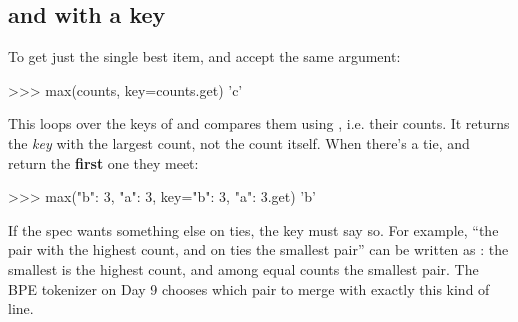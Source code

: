 \documentclass[10pt,a4paper]{article}
\begin{document}
\subsection{ and  with a key}
To get just the single best item,  and  accept the same  argument:
\begin{txtcode}
>>> max(counts, key=counts.get)
'c'
\end{txtcode}
This loops over the keys of  and compares them using , i.e. their counts. It returns the \emph{key} with the largest count, not the count itself.
When there’s a tie,  and  return the \textbf{first} one they meet:
\begin{txtcode}
>>> max({"b": 3, "a": 3}, key={"b": 3, "a": 3}.get)
'b'
\end{txtcode}
If the spec wants something else on ties, the key must say so. For example, “the pair with the highest count, and on ties the smallest pair” can be written as : the smallest  is the highest count, and among equal counts the smallest pair. The BPE tokenizer on Day 9 chooses which pair to merge with exactly this kind of line.
\setcounter{section}{4}
\end{document}
